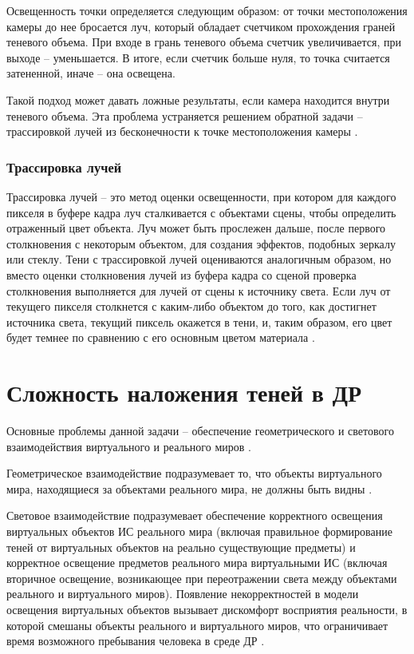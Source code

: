 Освещенность точки определяется следующим образом: от точки местоположения камеры до нее бросается луч, который обладает счетчиком прохождения граней теневого объема. При входе в грань теневого объема счетчик увеличивается, при выходе -- уменьшается. В итоге, если счетчик больше нуля, то точка считается затененной, иначе -- она освещена.

Такой подход может давать ложные результаты, если камера находится внутри теневого объема. Эта проблема устраняется решением обратной задачи -- трассировкой лучей из бесконечности к точке местоположения камеры \cite{shad_vol}.

\subsubsection*{Трассировка лучей}

Трассировка лучей -- это метод оценки освещенности, при котором для каждого пикселя в буфере кадра луч сталкивается с объектами сцены, чтобы определить отраженный цвет объекта. Луч может быть прослежен дальше, после первого столкновения с некоторым объектом, для создания эффектов, подобных зеркалу или стеклу. Тени с трассировкой лучей оцениваются аналогичным образом, но вместо оценки столкновения лучей из буфера кадра со сценой проверка столкновения выполняется для лучей от сцены к источнику света. Если луч от текущего пикселя столкнется с каким-либо объектом до того, как достигнет источника света, текущий пиксель окажется в тени, и, таким образом, его цвет будет темнее по сравнению с его основным цветом материала \cite{engel2008programming}.

\section{Сложность наложения теней в ДР}

Основные проблемы данной задачи -- обеспечение геометрического и светового взаимодействия виртуального и реального миров \cite{sns_tras}.

Геометрическое взаимодействие подразумевает то, что объекты виртуального мира, находящиеся за объектами реального мира, не должны быть видны \cite{sns_tras}.

Световое взаимодействие подразумевает обеспечение корректного освещения виртуальных объектов ИС реального мира (включая правильное формирование теней от виртуальных объектов на реально существующие предметы) и корректное освещение предметов реального мира виртуальными ИС (включая вторичное освещение, возникающее при переотражении света между объектами реального и виртуального миров). Появление некорректностей в модели освещения виртуальных объектов вызывает дискомфорт восприятия реальности, в которой смешаны объекты реального и виртуального миров, что ограничивает время возможного пребывания человека в среде ДР \cite{sns_tras}.

